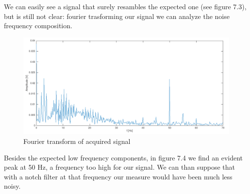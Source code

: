 We can easily see a signal that surely resambles the expected one (see figure 7.3), but is still  not clear: fourier trasforming our signal we can analyze the noise frequency composition.
\begin{figure}[H]
\centering
\includegraphics[width=.7\textwidth]{8/fft.png}
\caption{Fourier transform of acquired signal}
\end{figure}
Besides the expected low frequency components, in figure 7.4 we find an evident peak at 50 Hz, a frequency too high for our signal. We can than suppose that with a notch filter at that frequency our measure would have been much less noisy.

